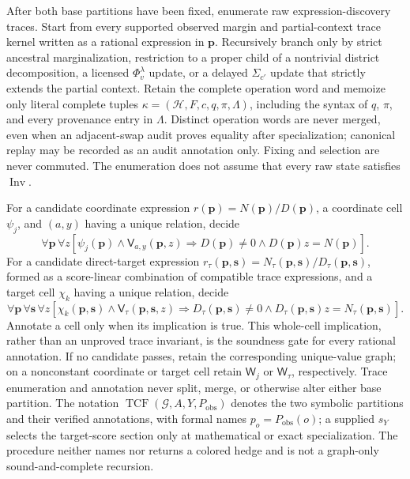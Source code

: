 After both base partitions have been fixed, enumerate raw expression-discovery traces. Start from every supported observed margin and partial-context trace kernel written as a rational expression in \(\mathbf p\). Recursively branch only by strict ancestral marginalization, restriction to a proper child of a nontrivial district decomposition, a licensed \(\Phi_v^{\lambda}\) update, or a delayed \(\Sigma_{c'}\) update that strictly extends the partial context. Retain the complete operation word and memoize only literal complete tuples \(\kappa=(\mathcal H,F,c,q,\pi,\Lambda)\), including the syntax of \(q\), \(\pi\), and every provenance entry in \(\Lambda\). Distinct operation words are never merged, even when an adjacent-swap audit proves equality after specialization; canonical replay may be recorded as an audit annotation only. Fixing and selection are never commuted. The enumeration does not assume that every raw state satisfies \(\operatorname{Inv}\).

For a candidate coordinate expression \(r(\mathbf p)=N(\mathbf p)/D(\mathbf p)\), a coordinate cell \(\psi_j\), and \((a,y)\) having a unique relation, decide
\[
\forall\mathbf p\,\forall z
\left[
\psi_j(\mathbf p)\wedge\mathsf V_{a,y}(\mathbf p,z)
\Longrightarrow
D(\mathbf p)\neq0\wedge D(\mathbf p)z=N(\mathbf p)
\right].
\]
For a candidate direct-target expression \(r_{\tau}(\mathbf p,\mathbf s)=N_{\tau}(\mathbf p,\mathbf s)/D_{\tau}(\mathbf p,\mathbf s)\), formed as a score-linear combination of compatible trace expressions, and a target cell \(\chi_k\) having a unique relation, decide
\[
\forall\mathbf p\,\forall\mathbf s\,\forall z
\left[
\chi_k(\mathbf p,\mathbf s)\wedge\mathsf V_{\tau}(\mathbf p,\mathbf s,z)
\Longrightarrow
D_{\tau}(\mathbf p,\mathbf s)\neq0
\wedge D_{\tau}(\mathbf p,\mathbf s)z=N_{\tau}(\mathbf p,\mathbf s)
\right].
\]
Annotate a cell only when its implication is true. This whole-cell implication, rather than an unproved trace invariant, is the soundness gate for every rational annotation. If no candidate passes, retain the corresponding unique-value graph; on a nonconstant coordinate or target cell retain \(\mathsf W_j\) or \(\mathsf W_{\tau}\), respectively. Trace enumeration and annotation never split, merge, or otherwise alter either base partition. The notation \(\operatorname{TCF}(\mathcal G,A,Y,P_{\mathrm{obs}})\) denotes the two symbolic partitions and their verified annotations, with formal names \(p_o=P_{\mathrm{obs}}(o)\); a supplied \(s_Y\) selects the target-score section only at mathematical or exact specialization. The procedure neither names nor returns a colored hedge and is not a graph-only sound-and-complete recursion.

